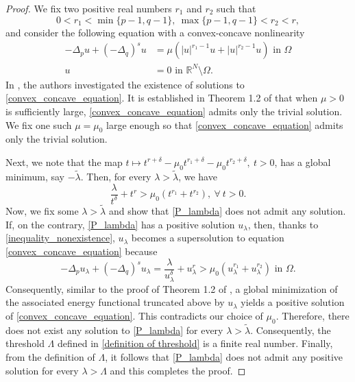\documentclass[reqno,oneside]{amsart}
\theoremstyle{definition}
\theoremstyle{remark}
\numberwithin{equation}{section}
\newcommand{\Om} {\Omega}
\newcommand{\p}{\Delta_p}
\newcommand{\qs}{(-\Delta_q)^s}
\newcommand{\bdry}{\mathbb{R}^N \setminus \Omega}
\newcommand{\la} {\lambda}
\begin{document}
\begin{proof}
    We fix two positive real numbers $r_1$ and $r_2$ such that
    \[0< r_1 < \min\{ p-1, q-1 \},\ \max\{ p-1, q-1 \} < r_2 <r,\]
    and consider the following equation with a convex-concave nonlinearity
    \begin{equation}\label{convex_concave_equation}
        \begin{aligned}
            -\p u + \qs u &= \mu \left(|u|^{r_1 -1}u + |u|^{r_2 -1}u \right) \text{ in } \Om\\
            u &= 0 \text{ in } \bdry.
        \end{aligned}
    \end{equation}
   In \cite{dhanya2025multiplicityresultsmixedlocal}, the authors investigated the existence of solutions to \eqref{convex_concave_equation}. It is established in Theorem 1.2 of \cite{dhanya2025multiplicityresultsmixedlocal} that when $\mu>0$ is sufficiently large, \eqref{convex_concave_equation} admits only the trivial solution. We fix one such $\mu=\mu_0$ large enough so that \eqref{convex_concave_equation} admits only the trivial solution.

    Next, we note that the map $t \mapsto t^{r+\delta} - \mu_0 t^{r_1 + \delta} - \mu_0 t^{r_2 + \delta},\ t>0$, has a global minimum, say $- \tilde{\la}$. Then, for every $\la > \tilde{\la}$, we have
    \begin{equation}\label{inequality_nonexistence}
        \frac{\la}{t^{\delta}} + t^r > \mu_0 \left(t^{r_1} + t^{r_2} \right),\ \forall\ t>0.
    \end{equation}
    Now, we fix some $\la > \tilde{\la}$ and show that \eqref{P_lambda} does not admit any solution. If, on the contrary, \eqref{P_lambda} has a positive solution $u_{\la}$, then, thanks to \eqref{inequality_nonexistence}, $u_{\la}$ becomes a supersolution to equation \eqref{convex_concave_equation} because
    \begin{equation}
        -\p u_{\la} + \qs u_{\la} = \frac{\la}{u_{\la}^{\delta}} + u_{\la}^r > \mu_0 \left(u_{\la}^{r_1} + u_{\la}^{r_2} \right) \text{ in } \Om.
    \end{equation}
    Consequently, similar to the proof of Theorem 1.2 of \cite{dhanya2025multiplicityresultsmixedlocal}, a global minimization of the associated energy functional truncated above by $u_\lambda$ yields a positive solution of \eqref{convex_concave_equation}. This contradicts our choice of $\mu_0$. Therefore, there does not exist any solution to \eqref{P_lambda} for every $\la > \tilde{\la}$. Consequently, the threshold $\Lambda$ defined in \eqref{definition of threshold} is a finite real number. Finally, from the definition of $\Lambda$, it follows that \eqref{P_lambda} does not admit any positive solution for every $\la > \Lambda$ and this completes the proof.
\end{proof}
\end{document}
